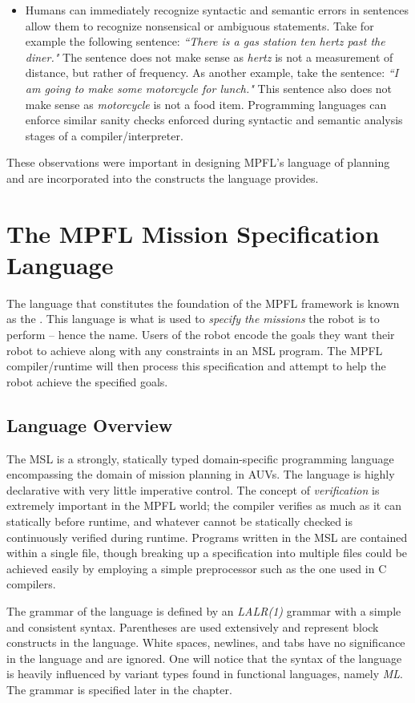 \begin{itemize}
\item Humans can immediately recognize syntactic and semantic errors in sentences allow  them to recognize nonsensical or ambiguous statements. Take for example the following sentence: \textit{``There is a gas station ten hertz past the diner."} The sentence does not make sense as \textit{hertz} is not a measurement of distance, but rather of frequency. As another example, take the sentence: \textit{``I am going to make some motorcycle for lunch."} This sentence also does not make sense as \textit{motorcycle} is not a food item. Programming languages can enforce similar sanity checks enforced during syntactic and semantic analysis stages of a compiler/interpreter.
\end{itemize}

These observations were important in designing MPFL's language of planning and are incorporated into the constructs the language provides.

\section{The MPFL Mission Specification Language}
The language that constitutes the foundation of the MPFL framework is known as the . This language is what is used to \textit{specify the missions} the robot is to perform -- hence the name. Users of the robot encode the goals they want their robot to achieve along with any constraints in an MSL program. The MPFL compiler/runtime will then process this specification and attempt to help the robot achieve the specified goals.

\subsection{Language Overview}
The MSL is a strongly, statically typed domain-specific programming language encompassing the domain of mission planning in AUVs. The language is highly declarative with very little imperative control. The concept of \emph{verification} is extremely important in the MPFL world; the compiler verifies as much as it can statically before runtime, and whatever cannot be statically checked is continuously verified during runtime. Programs written in the MSL are contained within a single file, though breaking up a specification into multiple files could be achieved easily by employing a simple preprocessor such as the one used in C compilers. 

The grammar of the language is defined by an \textit{LALR(1)} grammar with a simple and consistent syntax. Parentheses are used extensively and represent block constructs in the language. White spaces, newlines, and tabs have no significance in the language and are ignored. One will notice that the syntax of the language is heavily influenced by variant types found in functional languages, namely \textit{ML}. The grammar is specified later in the chapter.

